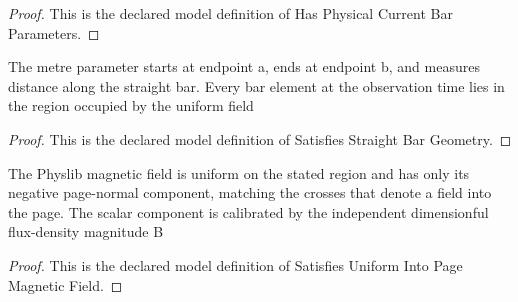 \begin{proof}
  This is the declared model definition of Has Physical Current Bar Parameters.
\end{proof}
\begin{definition}
  \label{def:physics:phyx-mini-0949:phyxminiproblems-problemphyxmini0949-satisfiesstraightbargeometry}
  The metre parameter starts at endpoint a, ends at endpoint b, and measures distance along the straight bar. Every bar element at the observation time lies in the region occupied by the uniform field
\end{definition}
\begin{proof}
  This is the declared model definition of Satisfies Straight Bar Geometry.
\end{proof}
\begin{definition}
  \label{def:physics:phyx-mini-0949:phyxminiproblems-problemphyxmini0949-satisfiesuniformintopagemagneticfield}
  The Physlib magnetic field is uniform on the stated region and has only its negative page-normal component, matching the crosses that denote a field into the page. The scalar component is calibrated by the independent dimensionful flux-density magnitude B
\end{definition}
\begin{proof}
  This is the declared model definition of Satisfies Uniform Into Page Magnetic Field.
\end{proof}
